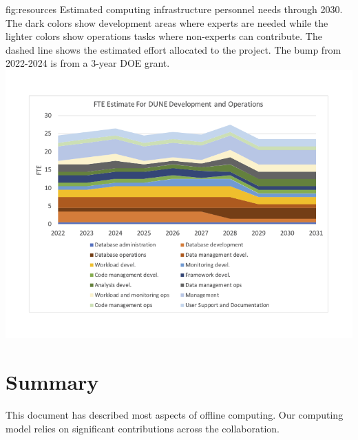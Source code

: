 \documentclass[../main-v1.tex]{subfiles}
\begin{document}
\begin{dunefigure}
{fig:resources}
{Estimated computing infrastructure personnel needs through 2030.  The dark colors show development areas where experts are needed while the lighter colors show operations tasks where non-experts can contribute. The dashed line shows the estimated effort allocated to the project.  The bump from 2022-2024 is from a 3-year DOE grant.}
{\includegraphics[width=0.9 \textwidth]{graphics/Resources/FTENeeds-2022-02-redo.png}}
\end{dunefigure}
\section{Summary}

This document has described most aspects of  offline computing. Our computing model relies on significant contributions across the collaboration.  

\end{document}
